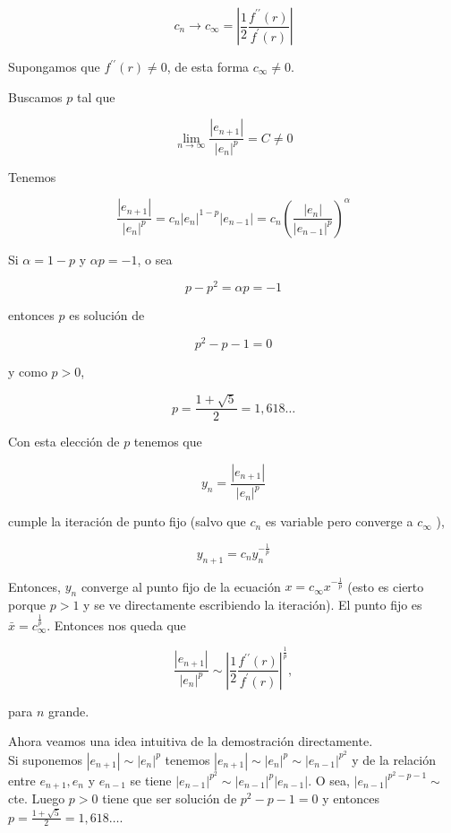 \documentclass[10pt]{article}
\begin{document}
$$
c_{n} \rightarrow c_{\infty}=\left|\frac{1}{2} \frac{f^{\prime \prime}(r)}{f^{\prime}(r)}\right|
$$

Supongamos que $f^{\prime \prime}(r) \neq 0$, de esta forma $c_{\infty} \neq 0$.

Buscamos $p$ tal que

$$
\lim _{n \rightarrow \infty} \frac{\left|e_{n+1}\right|}{\left|e_{n}\right|^{p}}=C \neq 0
$$

Tenemos

$$
\frac{\left|e_{n+1}\right|}{\left|e_{n}\right|^{p}}=c_{n}\left|e_{n}\right|^{1-p}\left|e_{n-1}\right|=c_{n}\left(\frac{\left|e_{n}\right|}{\left|e_{n-1}\right|^{p}}\right)^{\alpha}
$$

Si $\alpha=1-p$ y $\alpha p=-1$, o sea

$$
p-p^{2}=\alpha p=-1
$$

entonces $p$ es solución de

$$
p^{2}-p-1=0
$$

y como $p>0$,

$$
p=\frac{1+\sqrt{5}}{2}=1,618 \ldots
$$

Con esta elección de $p$ tenemos que

$$
y_{n}=\frac{\left|e_{n+1}\right|}{\left|e_{n}\right|^{p}}
$$

cumple la iteración de punto fijo (salvo que $c_{n}$ es variable pero converge a $c_{\infty}$ ),

$$
y_{n+1}=c_{n} y_{n}^{-\frac{1}{p}}
$$

Entonces, $y_{n}$ converge al punto fijo de la ecuación $x=c_{\infty} x^{-\frac{1}{p}}$ (esto es cierto porque $p>1$ y se ve directamente escribiendo la iteración). El punto fijo es $\bar{x}=c_{\infty}^{\frac{1}{p}}$. Entonces nos queda que

$$
\frac{\left|e_{n+1}\right|}{\left|e_{n}\right|^{p}} \sim\left|\frac{1}{2} \frac{f^{\prime \prime}(r)}{f^{\prime}(r)}\right|^{\frac{1}{p}},
$$

para $n$ grande.

Ahora veamos una idea intuitiva de la demostración directamente.\\
Si suponemos $\left|e_{n+1}\right| \sim\left|e_{n}\right|^{p}$ tenemos $\left|e_{n+1}\right| \sim\left|e_{n}\right|^{p} \sim\left|e_{n-1}\right|^{p^{2}}$ y de la relación entre $e_{n+1}, e_{n}$ y $e_{n-1}$ se tiene $\left|e_{n-1}\right|^{p^{2}} \sim\left|e_{n-1}\right|^{p}\left|e_{n-1}\right|$. O sea, $\left|e_{n-1}\right|^{p^{2}-p-1} \sim$ cte. Luego $p>0$ tiene que ser solución de $p^{2}-p-1=0$ y entonces $p=\frac{1+\sqrt{5}}{2}=1,618 \ldots$.
\end{document}
